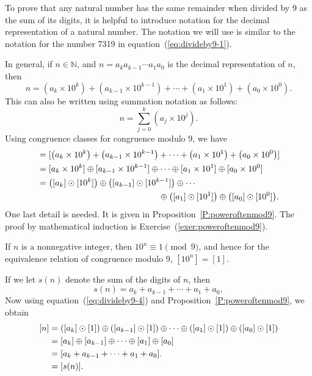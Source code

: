 \vskip6pt
To prove that any natural number has the same remainder when divided by 9 as the sum of its digits, it is helpful to introduce notation for the decimal representation of a natural number.  The notation we will use is similar to the notation for the number 7319 in equation~(\ref{eq:divideby9-1}).

In general, if  $n \in \mathbb{N}$, and  $n = a_k a_{k - 1}  \cdots a_1 a_0 $ is the decimal representation of  $n$, then
\[
n = \left( {a_k  \times 10^k } \right) + \left( {a_{k - 1}  \times 10^{k - 1} } \right) +  \cdots  + \left( {a_1  \times 10^1 } \right) + \left( {a_0  \times 10^0 } \right)\!.
\]
This can also be written using summation notation as follows:
\[
n = \sum\limits_{j = 0}^k {\left( {a_j  \times 10^j } \right)} .
\]
Using congruence classes for congruence modulo 9, we have
\begin{align}
[ n ] &= [ {\left( {a_k  \times 10^k } \right) + \left( {a_{k - 1}  \times 10^{k - 1} } \right) +  \cdots  + \left( {a_1  \times 10^1 } \right) + \left( {a_0  \times 10^0 } \right)} ]  \notag \\ 
                 &= [ {a_k  \times 10^k } ] \oplus [ {a_{k - 1}  \times 10^{k - 1} } ] \oplus  \cdots  \oplus [ {a_1  \times 10^1 } ] \oplus [ {a_0  \times 10^0 } ]  \notag \\ \notag 
%
                &= \left( {[ {a_k } ] \odot [ {10^k } ]} \right) \oplus \left( {[ {a_{k - 1} } ] \odot [ {10^{k - 1} } ]} \right) \oplus 
\cdots \\
& \hspace{5cm} \oplus \left( {[ {a_1 } ] \odot [ {10^1 } ]} \right) \oplus \left( {[ {a_0 } ] \odot [ {10^0 } ]} \right)\!.\label{eq:divideby9-4}
\end{align}  %
%
\setcounter{equation}{0}
One last detail is needed.  It is given in Proposition~\ref{P:poweroftenmod9}.  The proof by mathematical induction is Exercise~(\ref{exer:poweroftenmod9}).
%
\begin{proposition} \label{P:poweroftenmod9}
If  $n$  is a nonnegative integer, then  $10^n  \equiv 1 \pmod 9$, and hence for the equivalence relation of congruence modulo  9, $[ {10^n } ] = [ 1 ]$.
\end{proposition}
%
\noindent
If we let  $s( n )$ denote the sum of the digits of  $n$, then  
\[
s( n ) = a_k  + a_{k - 1}  +  \cdots  + a_1  + a_0,
\]
Now using equation~(\ref{eq:divideby9-4}) and Proposition~\ref{P:poweroftenmod9}, we obtain
\begin{align} \notag
[ n ] &= \left( {[ {a_k } ] \odot [ 1 ]} \right) \oplus \left( {[ {a_{k - 1} } ] \odot [ 1 ]} \right) \oplus  \cdots  \oplus \left( {[ {a_1 } ] \odot [ 1 ]} \right) \oplus \left( {[ {a_0 } ] \odot [ 1 ]} \right)  \notag \\ 
                 &= [ {a_k } ] \oplus [ {a_{k - 1} } ] \oplus  \cdots  \oplus [ {a_1 } ] \oplus [ {a_0 } ] \notag \\ 
                 &= [ {a_k  + a_{k - 1}  +  \cdots  + a_1  + a_0 } ]. \notag \\
                 &= [ s( n ) ]. \notag
\end{align}
